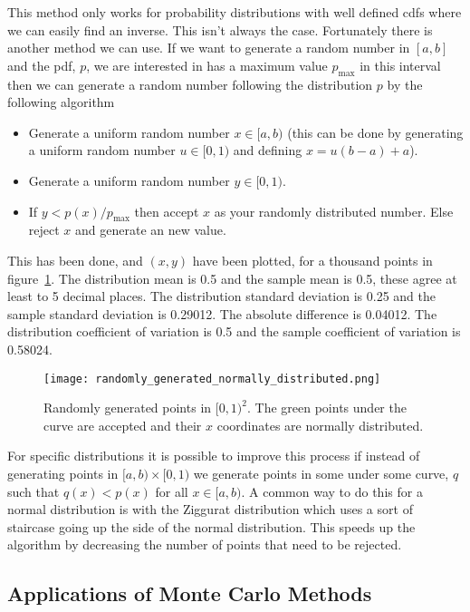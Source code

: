 \documentclass[a4paper]{article}
\begin{document}
    This method only works for probability distributions with well defined \glspl{cdf} where we can easily find an inverse.
    This isn't always the case.
    Fortunately there is another method we can use.
    If we want to generate a random number in \([a, b]\) and the \gls{pdf}, \(p\), we are interested in has a maximum value \(p_{\max}\) in this interval then we can generate a random number following the distribution \(p\) by the following algorithm
    \begin{itemize}
        \item Generate a uniform random number \(x\in[a, b)\) (this can be done by generating a uniform random number \(u\in[0, 1)\) and defining \(x = u(b - a) + a\)).
        \item Generate a uniform random number \(y\in[0, 1)\).
        \item If \(y < p(x)/p_{\max}\) then accept \(x\) as your randomly distributed number.
        Else reject \(x\) and generate an new value.
    \end{itemize}
    This has been done, and \((x, y)\) have been plotted, for a thousand points in figure~\ref{fig:rng normal}.
    The distribution mean is 0.5 and the sample mean is 0.5, these agree at least to 5 decimal places.
    The distribution standard deviation is 0.25 and the sample standard deviation is 0.29012. The absolute difference is 0.04012.
    The distribution coefficient of variation is 0.5 and the sample coefficient of variation is 0.58024.
    \begin{figure}[ht]
        \centering
        \texttt{[image: randomly\_generated\_normally\_distributed.png]}
        \caption{Randomly generated points in \([0, 1)^2\). The green points under the curve are accepted and their \(x\) coordinates are normally distributed.}
        \label{fig:rng normal}
    \end{figure}

    For specific distributions it is possible to improve this process if instead of generating points in \([a, b)\times[0, 1)\) we generate points in some under some curve, \(q\) such that \(q(x) < p(x)\) for all \(x \in [a, b)\).
    A common way to do this for a normal distribution is with the Ziggurat distribution which uses a sort of staircase going up the side of the normal distribution.
    This speeds up the algorithm by decreasing the number of points that need to be rejected.
    
    \subsection{Applications of Monte Carlo Methods}
\end{document}
